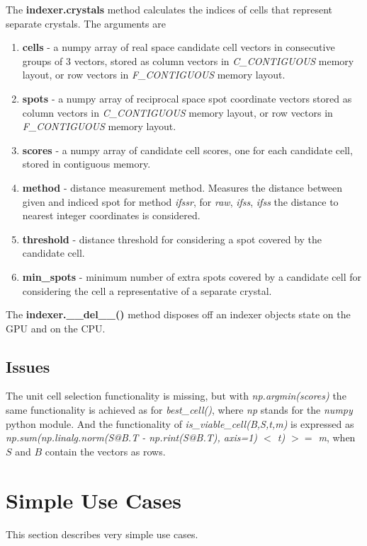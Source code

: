 \documentclass[a4paper,10pt]{article}
\begin{document}
The \textbf{indexer.crystals} method calculates the indices of cells that represent separate crystals. The arguments are
%
\begin{enumerate}
 \item \textbf{cells} - a numpy array of real space candidate cell vectors in consecutive groups of 3 vectors, stored as column vectors in \emph{C\_CONTIGUOUS} memory layout, or row vectors in \emph{F\_CONTIGUOUS} memory layout.
 \item \textbf{spots} - a numpy array of reciprocal space spot coordinate vectors stored as column vectors in \emph{C\_CONTIGUOUS} memory layout, or row vectors in \emph{F\_CONTIGUOUS} memory layout.
 \item \textbf{scores} - a numpy array of candidate cell scores, one for each candidate cell, stored in contiguous memory.
 \item \textbf{method} - distance measurement method. Measures the distance between given and indiced spot for method \emph{ifssr}, for \emph{raw}, \emph{ifss}, \emph{ifss} the distance to nearest integer coordinates is considered.
 \item \textbf{threshold} - distance threshold for considering a spot covered by the candidate cell.
 \item \textbf{min\_spots} - minimum number of extra spots covered by a candidate cell for considering the cell a representative of a separate crystal.
\end{enumerate}

The \textbf{indexer.\_\_del\_\_()} method disposes off an indexer objects state on the GPU and on the CPU.

\subsection{Issues}

The unit cell selection functionality is missing, but with \emph{np.argmin(scores)} the same functionality is achieved as for \emph{best\_cell()}, where \emph{np} stands for the \emph{numpy} python module. And the functionality of \emph{is\_viable\_cell(B,S,t,m)} is expressed as \emph{np.sum(np.linalg.norm(S@B.T - np.rint(S@B.T), axis=1) $<$ t) $>=$ m}, when $S$ and $B$ contain the vectors as rows.

\section{Simple Use Cases}

This section describes very simple use cases.
\end{document}
